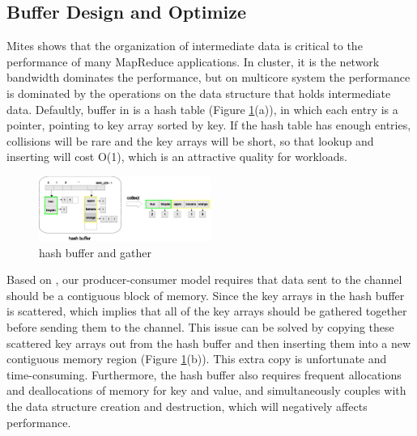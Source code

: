 \subsection{Buffer Design and Optimize}
Mites \cite{mao2010metis} shows that the organization of intermediate data is critical to the performance of many MapReduce applications.
In cluster, it is the network bandwidth dominates the performance, but on multicore system the performance is dominated by the operations on the  data structure that holds intermediate data.
Defaultly, buffer in \myds is a hash table (Figure \ref{fig:dmr:hash-buffer}(a)), in which each entry is a pointer, pointing to key array sorted by key.
If the hash table has enough entries, collisions will be rare and the key arrays will be short,
so that lookup and inserting will cost O(1), which is an attractive quality for workloads.


\begin{figure}[!h!t]  
	\centering
	\includegraphics[width=0.5\textwidth]{eps/dmr_hash_buffer.eps}
	\caption{hash buffer and gather}
	\label{fig:dmr:hash-buffer}
\end{figure}



Based on \myth, our producer-consumer model  requires that data sent to the channel should be a contiguous block of memory.
Since the key arrays in the hash buffer is scattered, which implies that all of the key arrays should be gathered together before sending them to the channel.
This issue can be solved by copying these scattered key arrays out  from the hash buffer and then inserting them into a new contiguous memory region (Figure \ref{fig:dmr:hash-buffer}(b)).
This extra copy is unfortunate and time-consuming.
Furthermore, the hash buffer also requires frequent allocations and deallocations of memory for key and value, and simultaneously couples with the data structure creation and destruction, which will 
negatively affects performance.

